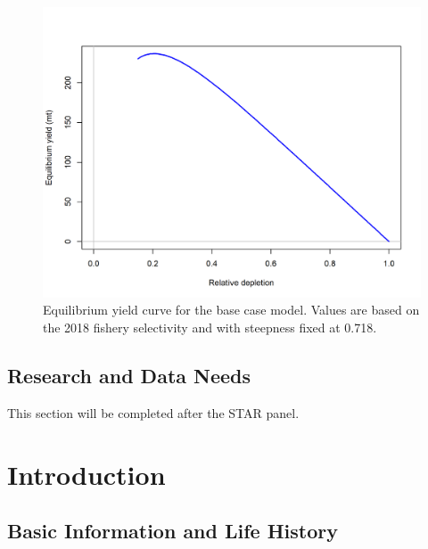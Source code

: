 \documentclass[12pt,]{article}
\begin{document}
\begin{figure}
\centering
\includegraphics{r4ss/plots_mod1/yield1_yield_curve.png}
\caption{Equilibrium yield curve for the base case model. Values are
based on the 2018 fishery selectivity and with steepness fixed at 0.718.
\label{fig:Yield_all}}
\end{figure}

\FloatBarrier

\newpage

\subsection*{Research and Data Needs}\label{research-and-data-needs}

This section will be completed after the STAR panel.

\newpage

\renewcommand{\thefigure}{\arabic{figure}}
\renewcommand{\thetable}{\arabic{table}}

\setcounter{figure}{0} \setcounter{table}{0}


\section{Introduction}\label{introduction}

\subsection{Basic Information and Life
History}\label{basic-information-and-life-history}
\end{document}
